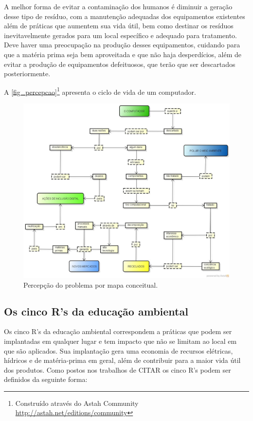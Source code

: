A melhor forma de evitar a contaminação dos humanos é diminuir a geração desse tipo de resíduo, com a manutenção adequadas dos equipamentos existentes além de práticas que aumentem sua vida útil, bem como destinar os resíduos inevitavelmente gerados para um local específico e adequado para tratamento. Deve haver uma preocupação na produção desses equipamentos, cuidando para que a matéria prima seja bem aproveitada e que não haja desperdícios, além de evitar a produção de equipamentos defeituosos, que terão que ser descartados posteriormente.

A \autoref{fig_percepcao}\footnote{Construído através do Astah Community \url{http://astah.net/editions/community}} apresenta o ciclo de vida de um computador.

\begin{figure}[htb]
	\caption{\label{fig_percepcao}Percepção do problema por mapa conceitual.}
	\begin{center}
	    \includegraphics[scale=0.35]{imagens/percepcao-problema.jpg}
	\end{center}
\end{figure}

\subsection{Os cinco R's da educação ambiental}

Os cinco R’s da educação ambiental correspondem a práticas que podem ser implantadas em qualquer lugar e tem impacto que não se limitam ao local em que são aplicados. Sua implantação gera uma economia de recursos elétricas, hídricos e de matéria-prima em geral, além de contribuir para a maior vida útil dos produtos. Como postos nos trabalhos de CITAR os cinco R's podem ser definidos da seguinte forma:


